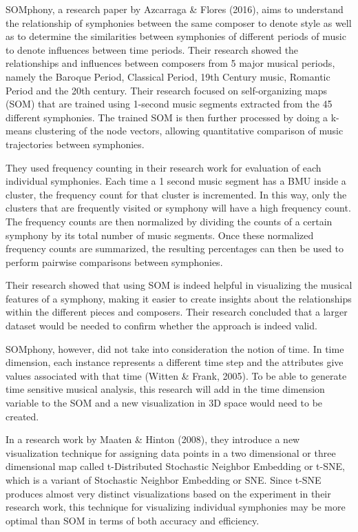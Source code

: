 SOMphony, a research paper by Azcarraga \& Flores (2016), aims to understand the relationship of symphonies between the same composer to denote style as well as to determine the similarities between symphonies of different periods of music to denote influences between time periods. Their research showed the relationships and influences between composers from 5 major musical periods, namely the Baroque Period, Classical Period, 19th Century music, Romantic Period and the 20th century. Their research focused on self-organizing maps (SOM) that are trained using 1-second music segments extracted from the 45 different symphonies. The trained SOM is then further processed by doing a k-means clustering of the node vectors, allowing quantitative comparison of music trajectories between symphonies. 

They used frequency counting in their research work for evaluation of each individual symphonies. Each time a 1 second music segment has a BMU inside a cluster, the frequency count for that cluster is incremented. In this way, only the clusters that are frequently visited or symphony will have a high frequency count. The frequency counts are then normalized by dividing the counts of a certain symphony by its total number of music segments. Once these normalized frequency counts are summarized, the resulting percentages can then be used to perform pairwise comparisons between symphonies.

Their research showed that using SOM is indeed helpful in visualizing the musical features of a symphony, making it easier to create insights about the relationships within the different pieces and composers. Their research concluded that a larger dataset would be needed to confirm whether the approach is indeed valid. 

SOMphony, however, did not take into consideration the notion of time. In time dimension, each instance represents a different time step and the attributes give values associated with that time (Witten  \& Frank, 2005).  To be able to generate time sensitive musical analysis, this research will add in the time dimension variable to the SOM and a new visualization in 3D space would need to be created.

In a research work by Maaten \& Hinton (2008), they introduce a new visualization technique for assigning data points in a two dimensional or three dimensional map called  t-Distributed Stochastic Neighbor Embedding or t-SNE, which is a variant of Stochastic Neighbor Embedding or SNE. Since t-SNE produces almost very distinct visualizations based on the experiment in their research work, this technique for visualizing individual symphonies may be more optimal than SOM in terms of both accuracy and efficiency.



